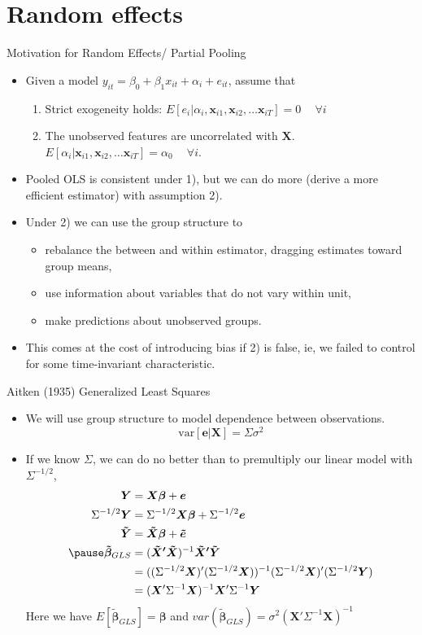 \documentclass[aspectratio=169, handout, t]{beamer}
\numberwithin{equation}{section}
\begin{document}
\section{Random effects}
\begin{frame}{Motivation for Random Effects/ Partial Pooling}

\begin{itemize}
\item Given a model $y_{it}=\beta_0+\beta_1x_{it}+\alpha_i+e_{it}$, assume that 
\begin{enumerate}
\item Strict exogeneity holds: $E[e_i|\alpha_i,\bm{x}_{i1},\bm{x}_{i2},\ldots \bm{x}_{iT}]=0\ \quad \forall i$ 
\item The unobserved features are uncorrelated with $\bm{X}.$ $E[\alpha_i|\bm{x}_{i1},\bm{x}_{i2},\ldots \bm{x}_{iT}]=\alpha_0\ \quad \forall i$.
\end{enumerate}
\item Pooled OLS is consistent under 1), but we can do more (derive a more efficient estimator) with assumption 2).
\item Under 2) we can use the group structure to 
\begin{itemize}
\item rebalance the between and within estimator, dragging estimates toward group means,
\item use information about variables that do not vary within unit,
\item make predictions about unobserved groups.
\end{itemize}
\item This comes at the cost of introducing bias if 2) is false, ie, we failed to control for some time-invariant characteristic.
\end{itemize}
\end{frame}


\begin{frame}{Aitken (1935) Generalized Least Squares}
\begin{itemize}
\item We will use group structure to model dependence between observations.
$$\text{var}[\bm{e}|\bm{X}]=\Sigma\sigma^2$$
\item If we know $\Sigma$, we can do no better than to premultiply our linear model with  $\Sigma^{-1/2}$,
\begin{align*}
\bm{Y}&=\bm{X\beta}+\bm{e}\\
\Sigma^{-1/2}\bm{Y}&=\Sigma^{-1/2}\bm{X\beta}+\Sigma^{-1/2}\bm{e}\\
\bm{\tilde{Y}}&=\bm{\tilde{X}\beta}+\bm{\tilde{e}}\\\pause
\bm{\tilde{\beta}}_{GLS}&=(\bm{\tilde{X}'\tilde{X}})^{-1}\bm{\tilde{X}'\tilde{Y}}\\
&=((\Sigma^{-1/2}\bm{X})'(\Sigma^{-1/2}\bm{X}))^{-1}(\Sigma^{-1/2}\bm{X})'(\Sigma^{-1/2}\bm{Y})\\
&=(\bm{X}'\Sigma^{-1}\bm{X})^{-1}\bm{X}'\Sigma^{-1}\bm{Y}
\end{align*}
Here we have $E[\bm{\tilde{\beta}}_{GLS}]=\bm{\beta}$ and 
$var(\bm{\tilde{\beta}}_{GLS})=\sigma^2(\bm{X}'\Sigma^{-1}\bm{X})^{-1}$
\end{itemize}
\end{frame}
\end{document}

